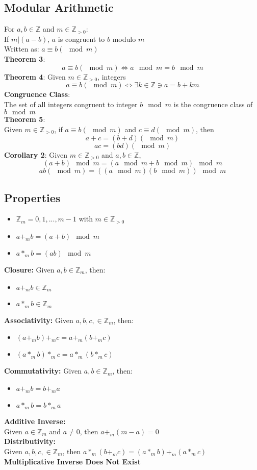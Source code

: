 \documentclass[letter]{article}
\begin{document}
\begin{multicols}{2}
  \subsection{Modular Arithmetic}\noindent
  For $a, b \in \mathbb{Z}$ and $m \in \mathbb{Z}_{>0}$: \\
  If $m|(a-b)$, $a$ is congruent to $b$ modulo $m$ \\
  Written as: $a \equiv b(\mod m)$ \\
  \textbf{Theorem 3}:
  $$a \equiv b(\mod m) \iff a \mod  m = b \mod m$$
  \textbf{Theorem 4}: Given $m \in \mathbb{Z}_{>0}$, integers
  $$a \equiv b(\mod m) \iff \exists k \in \mathbb{Z} \ni a = b + km$$
  \textbf{Congruence Class}:\\ The set of all integers congruent to integer
  $b \mod m$ is the congruence class of $b \mod m$ \\
  \textbf{Theorem 5}:\\ Given $m \in \mathbb{Z}_{>0}$, if $a \equiv b(\mod m)$
  and $c \equiv d(\mod m)$, then
  $$a + c = (b + d)(\mod m)$$
  $$ac = (bd)(\mod m)$$
  \textbf{Corollary 2}: Given $m \in \mathbb{Z}_{>0}$ and $a, b \in \mathbb{Z}$,
  $$(a+b)\mod m = (a\mod m + b\mod m)\mod m$$
  $$ab(\mod m) = ((a\mod m)(b\mod m))\mod m$$

  \subsection{Properties}\noindent
  \begin{itemize}[noitemsep]
	  \item $\mathbb{Z}_m = {0, 1, ..., m- 1}$ with $ m\in \mathbb{Z}_{>0}$
	  \item $a+_mb = (a + b)\mod m$
	  \item $a*_mb = (ab)\mod m$
  \end{itemize}
  \textbf{Closure:} Given $a, b \in \mathbb{Z}_m$, then:
  \begin{itemize}[noitemsep]
	  \item $a+_mb \in \mathbb{Z}_m$
	  \item $a*_mb \in \mathbb{Z}_m$
  \end{itemize}
  \textbf{Associativity:} Given $a, b, c, \in \mathbb{Z}_m$, then:
  \begin{itemize}[noitemsep]
  	\item $(a +_mb)+_mc = a+_m(b+_mc)$
	\item $(a *_mb)*_mc = a*_m(b*_mc)$
  \end{itemize}
  \textbf{Commutativity:} Given $a, b \in \mathbb{Z}_m$, then:
  \begin{itemize}[noitemsep]
	  \item $a+_mb = b+_ma$
	  \item $a*_mb = b*_ma$
  \end{itemize}
  \textbf{Additive Inverse:}\\ Given $a \in \mathbb{Z}_m$ and $a \neq 0$, then
  $a+_m(m - a) = 0$ \\
  \textbf{Distributivity:}\\ Given $a, b, c, \in \mathbb{Z}_m$, then
  $a*_m(b+_mc) = (a*_mb) +_m (a*_mc)$ \\
  \textbf{Multiplicative Inverse Does Not Exist}


\end{multicols}
\end{document}
